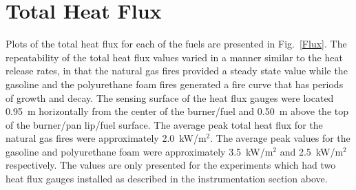 \documentclass[twoside]{uocthesis}
\begin{document}
{{\section{Total Heat Flux}

Plots of the total heat flux for each of the fuels are presented in Fig.~\ref{Flux}. The repeatability of the total heat flux values varied in a manner similar to the heat release rates, in that the natural gas fires provided a steady state value while the gasoline and the polyurethane foam fires generated a fire curve that has periods of growth and decay.   The sensing surface of the heat flux gauges were located 0.95~m horizontally from the center of the burner/fuel and 0.50~m above the top of the burner/pan lip/fuel surface.  The average peak total heat flux for the natural gas fires were approximately 2.0~kW/m$^2$.  The average peak values for the gasoline and polyurethane foam were approximately 3.5~kW/m$^2$ and 2.5~kW/m$^2$ respectively.  The values are only presented for the experiments which had two heat flux gauges installed as described in the instrumentation section above.

}}
\end{document}
